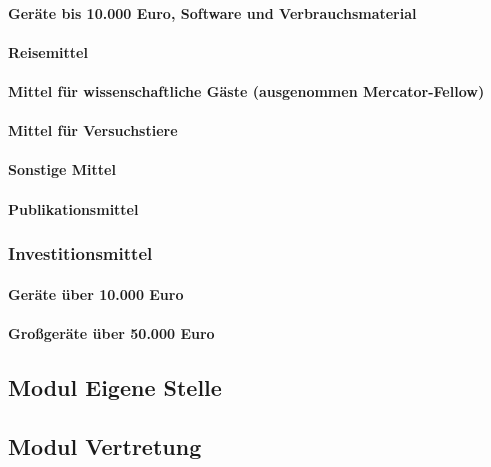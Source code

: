 \documentclass[de]{dfg-proposal}
\begin{document}
                \paragraph{Geräte bis 10.000 Euro, Software und Verbrauchsmaterial}

                \paragraph{Reisemittel}

                \paragraph{Mittel für wissenschaftliche Gäste (ausgenommen Mercator-Fellow)}

                \paragraph{Mittel für Versuchstiere}

                \paragraph{Sonstige Mittel}

                \paragraph{Publikationsmittel}

            \subsubsection{Investitionsmittel}

                \paragraph{Geräte über 10.000 Euro}

                \paragraph{Großgeräte über 50.000 Euro}

        \subsection{Modul Eigene Stelle}

        \subsection{Modul Vertretung}
\end{document}
